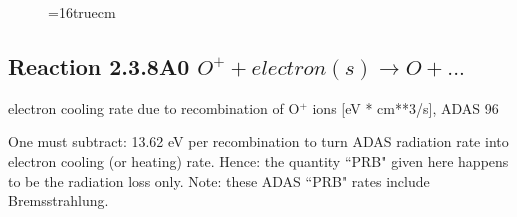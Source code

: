 \documentclass[12pt,dvips]{article}
\begin{document}
\begin{figure} \label{2.3.7rl}
\epsfxsize=16truecm 
\end{figure}
\newpage

\subsection{
  Reaction 2.3.8A0  $O^+ + electron(s) \rightarrow O   + ... $
}
electron cooling rate due to recombination of O$^+$ ions [eV *
cm**3/s], ADAS 96

One must subtract: 13.62 eV per recombination to turn ADAS radiation
rate into electron cooling (or heating) rate. Hence: the quantity
``PRB" given here happens to be the radiation loss only. Note: these
ADAS ``PRB" rates include Bremsstrahlung.
\end{document}
